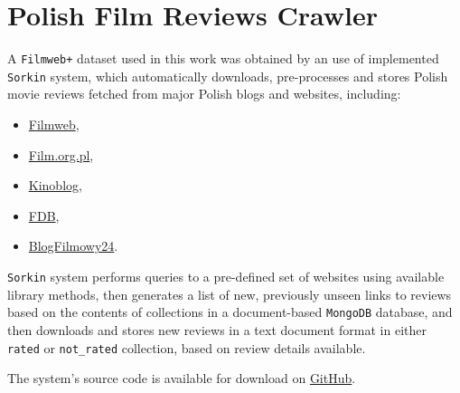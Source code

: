 \chapter{Polish Film Reviews Crawler}
\label{sorkin}

A \lstinline{Filmweb+} dataset used in this work was obtained by an use of implemented \lstinline{Sorkin} system, which automatically downloads, pre-processes and stores Polish movie reviews fetched from major Polish blogs and websites, including:

\begin{itemize}
    \item \href{https://www.filmweb.pl/}{Filmweb}, 
    \item \href{https://film.org.pl/}{Film.org.pl}, 
    \item \href{https://kinoblog.video.blog/}{Kinoblog}, 
    \item \href{https://fdb.pl/}{FDB}, 
    \item \href{http://blogfilmowy24.blogspot.com/}{BlogFilmowy24}.
\end{itemize}

\lstinline{Sorkin} system performs queries to a pre-defined set of websites using available library methods, then generates a list of new, previously unseen links to reviews based on the contents of collections in a document-based \lstinline{MongoDB} database, and then downloads and stores new reviews in a text document format in either \lstinline{rated} or \lstinline{not_rated} collection, based on review details available.

The system's source code is available for download on \href{https://github.com/maxster256/sorkin}{GitHub}.